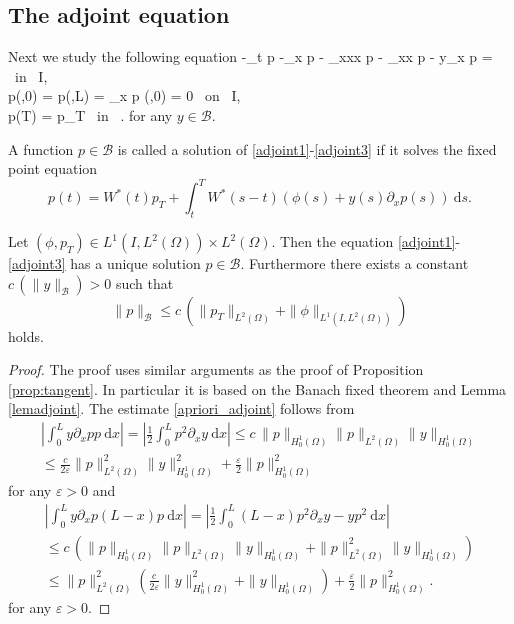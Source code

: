 \subsection{The adjoint equation}
\label{appendixadjoint}
Next we study the following equation
\besn
-\partial_t p -\partial_x p - \partial_{xxx} p - \gamma \partial_{xx} p  - y\partial_x p =  \phi \mbox{ in } I\times\Omega,\label{adjoint1}\\
p(\cdot,0) = p(\cdot,L) = \partial_x p (\cdot,0) = 0 \mbox{ on } I,\label{adjoint2}\\
p(T) = p_{T} \mbox{ in } \Omega.\label{adjoint3}
\eesn
for any $y\in \mathcal B$.
\begin{definition}
A function $p\in \mathcal B$ is called a solution of \eqref{adjoint1}-\eqref{adjoint3} if it solves the fixed point equation
\[
p(t)=W^*(t)p_T+\int_t^TW^*(s-t)(\phi(s)+y(s)\partial_x p(s))~\mathrm ds.
\]
\end{definition}
\begin{proposition}
Let $(\phi,p_T)\in L^1(I,L^2(\Omega))\times L^2(\Omega)$. Then the equation \eqref{adjoint1}-\eqref{adjoint3} has a unique solution $p\in \mathcal B$. Furthermore there exists a constant $c\,(\|y\|_{\mathcal B})>0$ such that
\begin{equation}\label{apriori_adjoint}
\|p\|_{\mathcal B}\leq c\,(\|p_T\|_{L^2(\Omega)}+\|\phi\|_{L^1(I,L^2(\Omega))})
\end{equation}
holds.
\end{proposition}
\begin{proof}
The proof uses similar arguments as the proof of Proposition \ref{prop:tangent}. In particular it is based on the Banach fixed theorem and Lemma \eqref{lemadjoint}. The estimate \eqref{apriori_adjoint} follows from
\begin{multline*}
\left|\int_0^Ly\partial_xpp~\mathrm dx\right|=\left|\frac 1 2\int_0^Lp^2\partial_xy~\mathrm dx\right|\leq c\,\|p\|_{H^1_0(\Omega)}\|p\|_{L^2(\Omega)}\|y\|_{H^1_0(\Omega)}\\
\leq \frac{c}{2\varepsilon}\|p\|_{L^2(\Omega)}^2\|y\|_{H^1_0(\Omega)}^2+\frac{\varepsilon}{2}\|p\|_{H^1_0(\Omega)}^2
\end{multline*}
for any $\varepsilon>0$ and
\begin{multline*}
\left|\int_0^Ly\partial_xp(L-x)p~\mathrm dx\right|=\left|\frac 1 2\int_0^L(L-x)p^2\partial_xy-yp^2~\mathrm dx\right|\\
\leq c\,\left(\|p\|_{H^1_0(\Omega)}\|p\|_{L^2(\Omega)}\|y\|_{H^1_0(\Omega)}+\|p\|_{L^2(\Omega)}^2\|y\|_{H^1_0(\Omega)}\right)\\
\leq \|p\|_{L^2(\Omega)}^2\left(\frac{c}{2\varepsilon}\|y\|_{H^1_0(\Omega)}^2+\|y\|_{H^1_0(\Omega)}\right)+\frac{\varepsilon}{2}\|p\|_{H^1_0(\Omega)}^2.
\end{multline*}
for any $\varepsilon>0$.
\qquad\end{proof}

